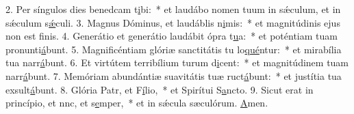 2. Per síngulos dies benedcam t\uline{i}bi:~* et laudábo nomen tuum in sǽculum, et in sǽculum s\uline{ǽ}culi.
3. Magnus Dóminus, et laudáblis n\uline{i}mis:~* et magnitúdinis ejus non est f\uline{i}nis.
4. Generátio et generátio laudábit ópra t\uline{u}a:~* et poténtiam tuam pronunti\uline{á}bunt.
5. Magnificéntiam glóriæ sanctitátis tu lo\uline{qué}ntur:~* et mirabília tua narr\uline{á}bunt.
6. Et virtútem terribílium turum d\uline{i}cent:~* et magnitúdinem tuam narr\uline{á}bunt.
7. Memóriam abundántiæ suavitátis tuæ ruct\uline{á}bunt:~* et justítia tua exsult\uline{á}bunt.
8. Glória Patr, et F\uline{í}lio,~* et Spirítui S\uline{a}ncto.
9. Sicut erat in princípio, et nnc, et s\uline{e}mper,~* et in sǽcula sæculórum. \uline{A}men.
